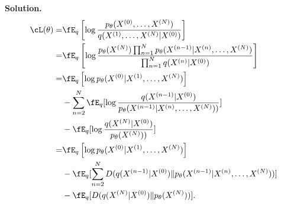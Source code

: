 \documentclass[12pt]{article}
\begin{document}
\begin{enumerate}
\begin{solution}
\textbf{Solution.}\\
\begin{align*}
    \cL(\theta) =& \fE_{q} \left[\log\frac{p_{\theta}(X^{(0)}, \dots, X^{(N)})}{q(X^{(1)}, \dots, X^{(N)}|X^{(0)})}\right]\\
    =& \fE_{q} \left[\log\frac{p_{\theta}(X^{(N)}) \prod_{n=1}^N p_{\theta}(X^{(n-1)}|X^{(n)}, \dots, X^{(N)})}{\prod_{n=1}^Nq(X^{(n)}|X^{(0)})}\right]\\
    =&\fE_{q} \left[\log p_{\theta}(X^{(0)}|X^{(1)}, \dots, X^{(N)})\right]\nonumber\\
    &-\sum_{n=2}^N \fE_q[\log \frac{q(X^{(n-1)}|X^{(0)})}{p_\theta(X^{(n-1)}|X^{(n)},\dots, X^{(N)}))}]\nonumber\\
    &-\fE_q[\log \frac{q(X^{(N)}|X^{(0)})}{p_\theta(X^{(N)}))}]\\
    =&\fE_{q} \left[\log p_{\theta}(X^{(0)}|X^{(1)}, \dots, X^{(N)})\right]\nonumber\\
    &-\fE_q[\sum_{n=2}^N D(q(X^{(n-1)}|X^{(0)})\| p_\theta(X^{(n-1)}|X^{(n)},\dots, X^{(N)}))]\nonumber\\
    &-\fE_q[D(q(X^{(N)}|X^{(0)})\|p_\theta(X^{(N)}))].
\end{align*}
\end{solution}




\begin{problem}
\end{problem}


\end{enumerate}
\end{document}

